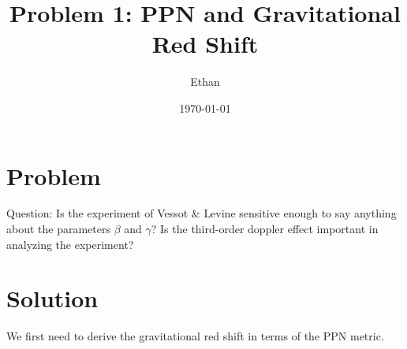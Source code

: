 \documentclass[11pt]{article}
\title{Problem 1: PPN and Gravitational Red Shift}
\author{Ethan}
\date{\today}
\begin{document}
\maketitle

\section*{Problem}
Question: Is the experiment of Vessot & Levine sensitive enough to say anything about the parameters $\beta$ and $\gamma$? Is the third-order doppler effect important in analyzing the experiment?

\section*{Solution}

We first need to derive the gravitational red shift in terms of the PPN metric.
\end{document}
